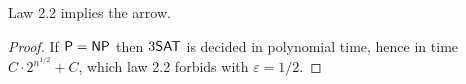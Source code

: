 \begin{theorem}
  \label{thm:law22-arrow}
  \leanok
  Law 2.2 implies the arrow.
\end{theorem}

\begin{proof}
  \leanok
  If $\mathsf{P} = \mathsf{NP}$ then $3\mathsf{SAT}$ is decided in polynomial time, hence in time
  $C \cdot 2^{n^{1/2}} + C$, which law 2.2 forbids with $\varepsilon = 1/2$.
\end{proof}
